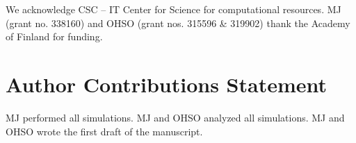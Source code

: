 \documentclass[journal=jctcce]{achemso}
\begin{document}
\begin{acknowledgement}
We acknowledge CSC -- IT Center for Science for computational resources.
%
MJ (grant no. 338160) and OHSO (grant nos. 315596 \& 319902) thank the Academy of Finland for funding.

\section*{Author Contributions Statement}

MJ performed all simulations. MJ and OHSO analyzed all simulations. MJ and OHSO wrote the first draft of the manuscript.

\end{acknowledgement}


\end{document}
